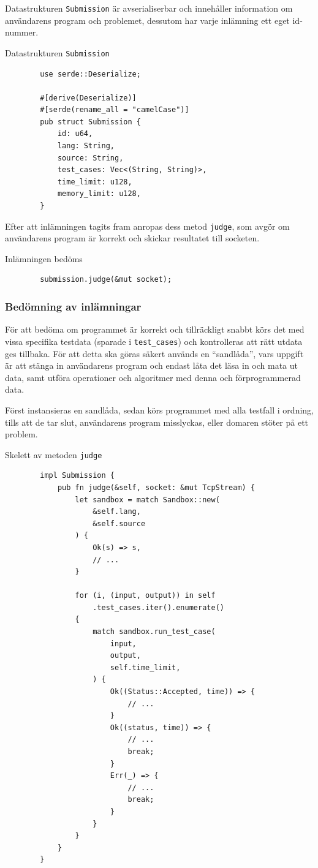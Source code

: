 \documentclass{article}
\begin{document}
Datastrukturen \texttt{Submission} är avserialiserbar och innehåller information
om användarens program och problemet, dessutom har varje inlämning ett eget
id-nummer.

\begin{listing}[H]
	\caption{Datastrukturen \texttt{Submission}}
	\begin{verbatim}
		use serde::Deserialize;

		#[derive(Deserialize)]
		#[serde(rename_all = "camelCase")]
		pub struct Submission {
			id: u64,
			lang: String,
			source: String,
			test_cases: Vec<(String, String)>,
			time_limit: u128,
			memory_limit: u128,
		}
	\end{verbatim}
\end{listing}

Efter att inlämningen tagits fram anropas dess metod \texttt{judge}, som avgör
om användarens program är korrekt och skickar resultatet till socketen.

\begin{listing}[H]
	\caption{Inlämningen bedöms \label{call-judge}}
	\begin{verbatim}
        submission.judge(&mut socket);
	\end{verbatim}
\end{listing}

\subsubsection{Bedömning av inlämningar}

För att bedöma om programmet är korrekt och tillräckligt snabbt körs det med
vissa specifika testdata (sparade i \texttt{test\_cases}) och kontrolleras
att rätt utdata ges tillbaka. För att detta ska göras säkert används en
``sandlåda'', vars uppgift är att stänga in användarens program och endast låta
det läsa in och mata ut data, samt utföra operationer och algoritmer med denna
och förprogrammerad data.

Först instansieras en sandlåda, sedan körs programmet med alla testfall i
ordning, tills att de tar slut, användarens program misslyckas, eller domaren
stöter på ett problem.

\begin{listing}[H]
	\caption{Skelett av metoden \texttt{judge}\label{judge-method}}
	\begin{verbatim}
		impl Submission {
			pub fn judge(&self, socket: &mut TcpStream) {
				let sandbox = match Sandbox::new(
					&self.lang,
					&self.source
				) {
					Ok(s) => s,
					// ...
				}

				for (i, (input, output)) in self
					.test_cases.iter().enumerate()
				{
					match sandbox.run_test_case(
						input,
						output,
						self.time_limit,
					) {
						Ok((Status::Accepted, time)) => {
							// ...
						}
						Ok((status, time)) => {
							// ...
							break;
						}
						Err(_) => {
							// ...
							break;
						}
					}
				}
			}
		}
	\end{verbatim}
\end{listing}
\end{document}
